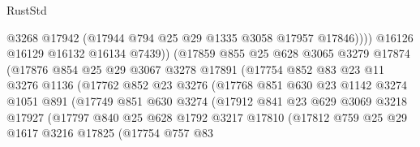 \begin{lexlean}{RustStd}
\begin{coremodule}
                                @3268
                                @17942
                                (@17944 @794 @25 @29 @1335 @3058 @17957 @17846))))
                          @16126
                          @16129
                          @16132
                          @16134
                          @7439))
                      (@17859
                        @855
                        @25
                        @628
                        @3065
                        @3279
                        @17874
                        (@17876
                          @854
                          @25
                          @29
                          @3067
                          @3278
                          @17891
                          (@17754
                            @852
                            @83
                            @23
                            @11
                            @3276
                            @1136
                            (@17762
                              @852
                              @23
                              @3276
                              (@17768
                                @851
                                @630
                                @23
                                @1142
                                @3274
                                @1051
                                @891
                                (@17749
                                  @851
                                  @630
                                  @3274
                                  (@17912
                                    @841
                                    @23
                                    @629
                                    @3069
                                    @3218
                                    @17927
                                    (@17797
                                      @840
                                      @25
                                      @628
                                      @1792
                                      @3217
                                      @17810
                                      (@17812
                                        @759
                                        @25
                                        @29
                                        @1617
                                        @3216
                                        @17825
                                        (@17754
                                          @757
                                          @83

\end{coremodule}
\end{lexlean}
